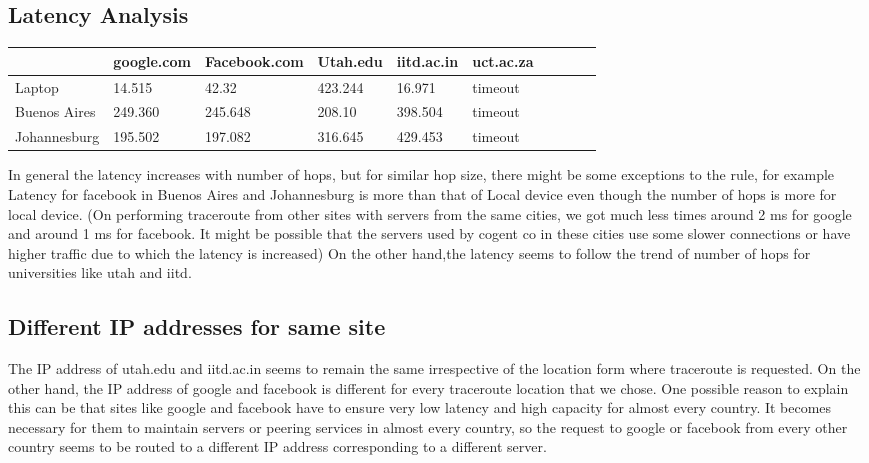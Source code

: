 \documentclass{article}
\begin{document}
\subsection*{Latency Analysis}


\begin{table}[!ht]
    \centering
    \begin{tabular}{|l|l|l|l|l|l|l|l|l|l|}
    \hline
        ~ & google.com & Facebook.com & Utah.edu & iitd.ac.in & uct.ac.za \\ \hline
        Laptop & 14.515 & 42.32 & 423.244 & 16.971 & timeout  \\ \hline
        Buenos Aires & 249.360 & 245.648 & 208.10 & 398.504 & timeout  \\ \hline
        Johannesburg & 195.502 & 197.082 & 316.645 & 429.453 & timeout \\ \hline
    \end{tabular}
\end{table}


In general the latency increases with number of hops, but for similar hop size, there might be some exceptions to the rule, for example 
Latency for facebook in Buenos Aires and Johannesburg is more than that of Local device even though the number of hops is more for local device.
(On performing traceroute from other sites with servers from the same cities,
we got much less times around 2 ms for google and around 1 ms for facebook. It might be possible that the servers used by cogent co in these cities use some slower connections or have higher traffic due to which the latency is increased)
On the other hand,the latency seems to follow the trend of number of hops for universities like utah and iitd.

\subsection*{Different IP addresses for same site}

The IP address of utah.edu and iitd.ac.in seems to remain the same irrespective of the location form where traceroute is requested.
On the other hand, the IP address of google and facebook is different for every traceroute location that we chose.
One possible reason to explain this can be that sites like google and facebook have to ensure very low latency and high capacity for
almost every country. It becomes necessary for them to maintain servers or peering services in almost every country, so the request to 
google or facebook from every other country seems to be routed to a different IP address corresponding to a different server.
\end{document}
